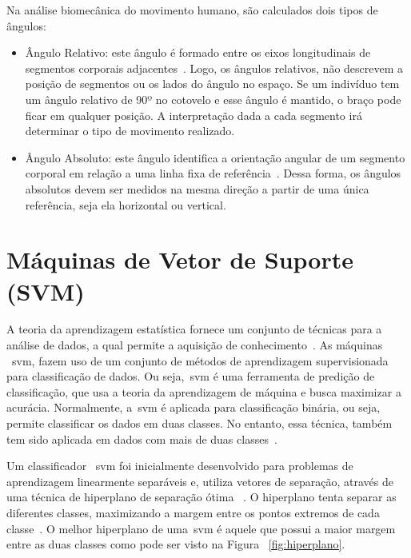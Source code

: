 Na análise biomecânica do movimento humano, são calculados dois tipos de ângulos:
	\begin{itemize}
		\item Ângulo Relativo: este ângulo é formado entre os eixos longitudinais de segmentos corporais adjacentes~\cite{hamill1999bases}. Logo, os ângulos relativos, não descrevem a posição de segmentos ou os lados do ângulo no espaço. Se um indivíduo tem um ângulo relativo de 90º no cotovelo e esse ângulo é mantido, o braço pode ficar em qualquer posição. A interpretação dada a cada segmento irá determinar o tipo de movimento realizado. 
		\item Ângulo Absoluto: este ângulo identifica a orientação angular de um segmento corporal em relação a uma linha fixa de referência~\cite{hamill1999bases}. Dessa forma, os ângulos absolutos devem ser medidos na mesma direção a partir de uma única referência, seja ela horizontal ou vertical.
	\end{itemize}



\section{Máquinas de Vetor de Suporte (SVM)}\label{sec:svm_linear}
A teoria da aprendizagem estatística fornece um conjunto de técnicas para a análise de dados, a qual permite a aquisição de conhecimento~\cite{vapnik95}. As máquinas ~\ac{svm}, fazem uso de um conjunto de métodos de aprendizagem supervisionada para classificação de dados. Ou seja,~\ac{svm} é uma ferramenta de predição de classificação, que usa a teoria da aprendizagem de máquina e busca maximizar a acurácia. Normalmente, a~\ac{svm} é aplicada para classificação binária, ou seja, permite classificar os dados em duas classes. No entanto, essa técnica, também tem sido aplicada em dados com mais de duas classes~\cite{multisvm2011}.

Um classificador ~\ac{svm} foi inicialmente desenvolvido para problemas de aprendizagem linearmente separáveis e, utiliza vetores de separação, através de uma técnica de hiperplano de separação ótima ~\cite{vapnik95}. O hiperplano tenta separar as diferentes classes, maximizando a margem entre os pontos extremos de cada classe~\cite{valt2010}. O melhor hiperplano de uma~\ac{svm} é aquele que possui a maior margem entre as duas classes como pode ser visto na Figura ~\ref{fig:hiperplano}.  

